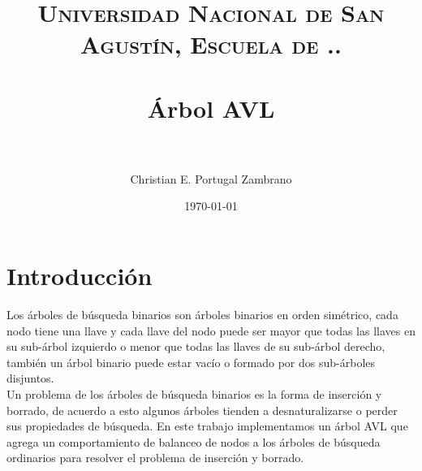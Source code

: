 \documentclass[paper=a4, fontsize=11pt]{scrartcl} %
\title{	
\normalfont \normalsize 
\textsc{Universidad Nacional de San Agustín, Escuela de ..} \\ [25pt] %
\horrule{0.5pt} \\[0.4cm] %
\huge Árbol AVL \\ %
\horrule{2pt} \\[0.5cm] %
}
\author{Christian E. Portugal Zambrano} %
\date{\normalsize\today} %
\numberwithin{equation}{section} %
\numberwithin{figure}{section} %
\numberwithin{table}{section} %
\begin{document}
\maketitle %


\section{Introducción}
Los árboles de búsqueda binarios son árboles binarios en orden simétrico, cada nodo tiene una llave y cada llave del nodo puede ser mayor que todas las llaves en su sub-árbol izquierdo o menor que todas las llaves de su sub-árbol derecho, también un árbol binario puede estar vacío o formado por dos sub-árboles disjuntos. \\Un problema de los árboles de búsqueda binarios es la forma de inserción y borrado, de acuerdo a esto algunos árboles tienden a desnaturalizarse o perder sus propiedades de búsqueda. En este trabajo implementamos un árbol AVL que agrega un comportamiento de balanceo de nodos a los árboles de búsqueda ordinarios para resolver el problema de inserción y borrado.

\end{document}
